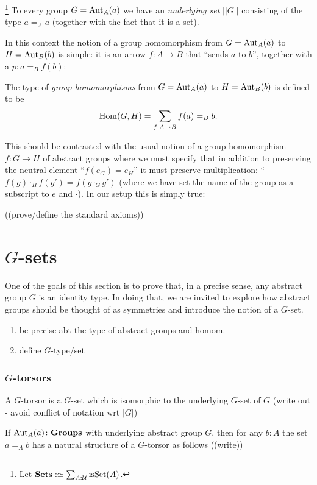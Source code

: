   
\footnote{Let $\mathbf{Sets}:\simeq \sum_{A:\mathcal U}\mathrm{isSet}(A)$.}
\newcommand{\setgroup}[1]{||#1||}
To every group $G=\mathrm{Aut}_A(a)$ we have an {\em underlying set} $\setgroup{G}$ consisting of the type $a=_Aa$ (together with the fact that it is a set).  



In this context the notion of a group homomorphism from $G=\mathrm{Aut}_A(a)$ to $H=\mathrm{Aut}_B(b)$ is simple: it is an arrow $f:A\to B$ that ``sends $a$ to $b$'', \ie together with a $p:a=_Bf(b)$:
\begin{definition}\label{def:grouphomomorphism}
  The type of {\em group homomorphisms} from $G=\mathrm{Aut}_A(a)$ to $H=\mathrm{Aut}_B(b)$ is defined to be
$$\mathrm{Hom}(G,H)=\sum_{f:A\to B}f(a)=_Bb.
$$
\end{definition}
This should be contrasted with the usual notion of a group homomorphism $f\colon G\to H$ of abstract groups where we must specify that in addition to preserving the neutral element ``$f(e_G)=e_H$'' it must preserve multiplication: ``$f(g)\cdot_H f(g')=f(g\cdot_G g')$ (where we have set the name of the group as a subscript to $e$ and $\cdot$).  In our setup this is simply true:

\begin{definition}\label{def:grouphomomaxioms}
  ((prove/define the standard axioms))
\end{definition}




\section{$G$-sets}
\label{sec:gsets}
One of the goals of this section is to prove that, in a precise sense, any abstract group $G$ is an identity type.  In doing that, we are invited to explore how abstract groups should be thought of as symmetries and introduce the notion of a $G$-set.

\begin{enumerate}
\item be precise abt the type of abstract groups and homom.
\item define $G$-type/set
\end{enumerate}
\subsubsection{$G$-torsors}
\label{sec:Gtorsors}
\newcommand{\Gtorsor}{\mathrm{tors}_G}
\begin{definition}
  A $G$-torsor is a $G$-set which is isomorphic to the underlying $G$-set of $G$ (write out - avoid conflict of notation wrt $|G|$)
\end{definition}
\begin{example}
  If $\mathrm{Aut}_A(a)\colon\mathbf{Groups}$ with underlying abstract group $G$, then for any $b:A$ the set $a=_Ab$ has a natural structure of a $G$-torsor as follows ((write))
\end{example}

